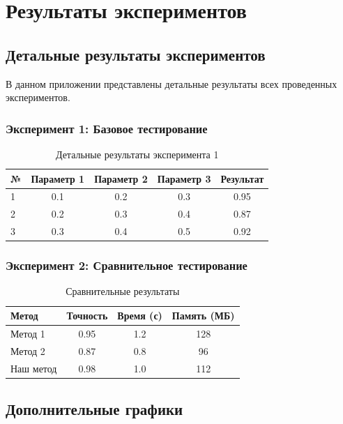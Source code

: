 \chapter{Результаты экспериментов}

\section{Детальные результаты экспериментов}

В данном приложении представлены детальные результаты всех проведенных экспериментов.

\subsection{Эксперимент 1: Базовое тестирование}

\begin{table}[H]
\centering
\caption{Детальные результаты эксперимента 1}
\begin{tabular}{|l|c|c|c|c|}
\hline
№ & Параметр 1 & Параметр 2 & Параметр 3 & Результат \\
\hline
1 & 0.1 & 0.2 & 0.3 & 0.95 \\
2 & 0.2 & 0.3 & 0.4 & 0.87 \\
3 & 0.3 & 0.4 & 0.5 & 0.92 \\
\hline
\end{tabular}
\label{tab:detailed_exp1}
\end{table}

\subsection{Эксперимент 2: Сравнительное тестирование}

\begin{table}[H]
\centering
\caption{Сравнительные результаты}
\begin{tabular}{|l|c|c|c|}
\hline
Метод & Точность & Время (с) & Память (МБ) \\
\hline
Метод 1 & 0.95 & 1.2 & 128 \\
Метод 2 & 0.87 & 0.8 & 96 \\
Наш метод & 0.98 & 1.0 & 112 \\
\hline
\end{tabular}
\label{tab:comparison}
\end{table}

\section{Дополнительные графики}

